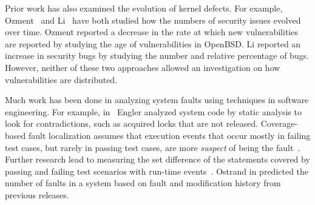 Prior work has also examined the evolution of kernel defects. For example, 
Ozment~\cite{ozment2006milk} and Li~\cite{li2006have} have 
both studied how the {numbers} of security issues evolved over 
{time}. Ozment reported a decrease in the rate at which new vulnerabilities 
are reported by studying the age of vulnerabilities in OpenBSD. Li 
reported an increase in security bugs by studying the number and relative 
percentage of bugs. However, neither of these two approaches allowed 
an investigation on how vulnerabilities are distributed. 

Much work has been done in analyzing system faults using techniques in 
software engineering. For example, 
in~\cite{engler2001bugs} Engler analyzed system code by static analysis
to look for contradictions, such as acquired locks that are
not released.
%
%
%
Coverage-based fault localization assumes that execution events that occur mostly in failing
test cases, but rarely in passing test cases, are more \textit{suspect}
of being the fault~\cite{jones2002visualization}. Further research lead to measuring the set
difference of the statements covered by passing and failing test scenarios with run-time events~\cite{agrawal1995fault, jones2005empirical, liblit2005scalable}. Ostrand in \cite{ostrand2005predicting}
predicted the number of faults in a system based on fault and modification history from previous releases.

